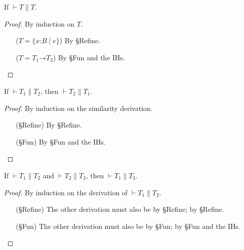\documentclass[9pt]{extarticle}
\newcommand{\ottnt}[1]{\mathit{#1}}
\newcommand{\ottsym}[1]{#1}
\begin{document}
\begin{lemma}
  \label{lem:similarityreflexive}
  If $\vdash  \ottnt{T}  \mathrel{\parallel}  \ottnt{T}$.
\begin{proof}
    By induction on $\ottnt{T}$.
\begin{itemize}
    \item[($\ottnt{T}  \ottsym{=}   \{ \mathit{x} \mathord{:} \ottnt{B} \mathrel{\mid} \ottnt{e} \} $)] By \S{Refine}.
    \item[($\ottnt{T}  \ottsym{=}   \ottnt{T_{{\mathrm{1}}}} \mathord{ \rightarrow } \ottnt{T_{{\mathrm{2}}}} $)] By \S{Fun} and the IHs.
    \end{itemize}
  \end{proof}
\end{lemma}

\begin{lemma}
  \label{lem:similaritysymmetric}
  If $\vdash  \ottnt{T_{{\mathrm{1}}}}  \mathrel{\parallel}  \ottnt{T_{{\mathrm{2}}}}$, then $\vdash  \ottnt{T_{{\mathrm{2}}}}  \mathrel{\parallel}  \ottnt{T_{{\mathrm{1}}}}$.
\begin{proof}
    By induction on the similarity derivation.
\begin{itemize}
    \item[(\S{Refine})] By \S{Refine}.
    \item[(\S{Fun})] By \S{Fun} and the IHs.
    \end{itemize}
  \end{proof}
\end{lemma}

\begin{lemma}
  \label{lem:similaritytransitive}
  If $\vdash  \ottnt{T_{{\mathrm{1}}}}  \mathrel{\parallel}  \ottnt{T_{{\mathrm{2}}}}$ and $\vdash  \ottnt{T_{{\mathrm{2}}}}  \mathrel{\parallel}  \ottnt{T_{{\mathrm{3}}}}$, then $\vdash  \ottnt{T_{{\mathrm{1}}}}  \mathrel{\parallel}  \ottnt{T_{{\mathrm{3}}}}$.
\begin{proof}
    By induction on the derivation of $\vdash  \ottnt{T_{{\mathrm{1}}}}  \mathrel{\parallel}  \ottnt{T_{{\mathrm{2}}}}$.
\begin{itemize}
    \item[(\S{Refine})] The other derivation must also be by \S{Refine}; by \S{Refine}.
    \item[(\S{Fun})] The other derivation must also be by \S{Fun}; by
      \S{Fun} and the IHs.
    \end{itemize}
  \end{proof}
\end{lemma}
\end{document}
